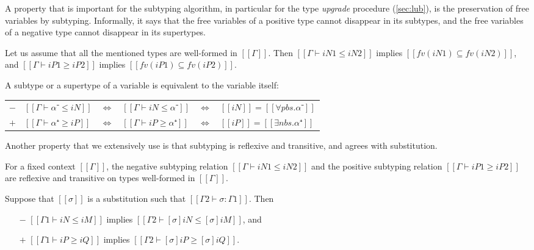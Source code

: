 A property that is important for the subtyping algorithm, 
in particular for the type \emph{upgrade} procedure (\cref{sec:lub}),
is the preservation of free variables by subtyping.
Informally, it says that the free variables
of a positive type cannot disappear in its subtypes,
and the free variables of a negative type
cannot disappear in its supertypes.

\begin{property}
  \label{prop:subtyping-preserves-fv}
  Let us assume that all the mentioned types are well-formed in $[[Γ]]$. Then
  $[[Γ ⊢ iN1 ≤ iN2]]$ implies $[[fv(iN1) ⊆ fv(iN2)]]$,
  and $[[Γ ⊢ iP1 ≥ iP2]]$ implies $[[fv(iP1) ⊆ fv(iP2)]]$.
\end{property}

\begin{property}
  \label{prop:var-no-subtypes}
  A subtype or a supertype of a variable is equivalent to the variable itself:

  \begin{tabular}{@{}llclcl@{}}
    $-$ & $[[Γ ⊢ α⁻ ≤ iN]]$ & $\iff$ & $[[Γ ⊢ iN ≤ α⁻]]$ & $\iff$ & $[[iN]] = [[∀pbs.α⁻]]$ \\
    $+$ & $[[Γ ⊢ α⁺ ≥ iP]]$ & $\iff$ & $[[Γ ⊢ iP ≥ α⁺]]$ & $\iff$ & $[[iP]] = [[∃nbs.α⁺]]$
  \end{tabular}
\end{property}

Another property that we extensively use is that subtyping is reflexive and transitive,
and agrees with substitution.

\begin{property}
  For a fixed context $[[Γ]]$, the negative subtyping relation 
  $[[Γ ⊢ iN1 ≤ iN2]]$ and the positive subtyping relation 
  $[[Γ ⊢ iP1 ≥ iP2]]$
  are reflexive and transitive on types well-formed in $[[Γ]]$.
\end{property}

\begin{property}
  Suppose that  $[[σ]]$ is a substitution such that $[[Γ2 ⊢ σ : Γ1]]$. 
  Then
  \begin{enumerate}
    \item [$-$] $[[Γ1 ⊢ iN ≤ iM]]$ implies $[[Γ2 ⊢ [σ]iN ≤ [σ]iM]]$, and
    \item [$+$] $[[Γ1 ⊢ iP ≥ iQ]]$ implies $[[Γ2 ⊢ [σ]iP ≥ [σ]iQ]]$.
  \end{enumerate}
\end{property}

